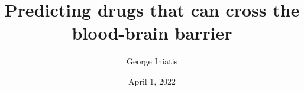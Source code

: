 \documentclass{l4proj}
\begin{document}
\title{Predicting drugs that can cross the blood-brain barrier} 
\author{George Iniatis}
\date{April 1, 2022}

\maketitle



%
%
%
\def\consentname {George Iniatis} %
\def\consentdate {1 April 2022} %
\educationalconsent



\tableofcontents

%
%
%
\end{document}

